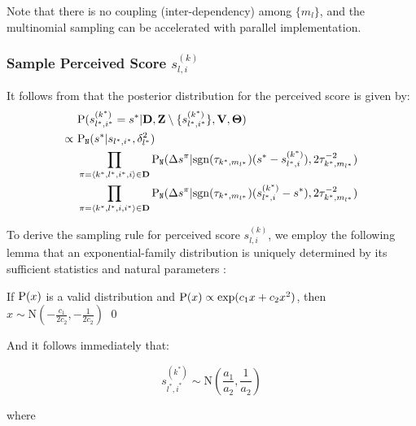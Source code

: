 Note that there is no coupling (inter-dependency) among $\{m_l\}$, and the
multinomial sampling can be accelerated with parallel implementation.

\subsubsection{Sample Perceived Score $s_{l,i}^{(k)}$}
It follows from  that the posterior distribution for the
perceived score is given by:
\begin{align}
& \P(s_{l^*,i^*}^{(k^*)} = s^* | \mathbf{D},
    \mathbf{Z}\setminus \{ s_{l^*,i^*}^{(k^*)} \}, \mathbf{V}, \mathbf{\Theta})
    \nonumber \\
\propto~ & \P_{\mathtt{N}}(s^* | s_{l^*,i^*}, \delta_{{l^*}}^2)
  \label{eq::tpp_s}\\
& \prod\limits_{\pi = \langle k^*,l^*,i^*,i\rangle \in \mathbf{D}}
    \P_{\mathtt{N}}(\Delta s^\pi |
      \mathrm{sgn}(\tau_{k^*,m_{l^*}}) ( s^* - s_{l^*,i}^{(k^*)}),
      2\tau_{k^*,m_{l^*}}^{-2}) \nonumber \\
& \prod\limits_{\pi = \langle k^*,l^*,i,i^*\rangle \in \mathbf{D}}
		\P_{\mathtt{N}}(\Delta s^\pi |
      \mathrm{sgn}(\tau_{k^*,m_{l^*}}) ( s_{l^*,i}^{(k^*)} - s^*),
      2\tau_{k^*,m_{l^*}}^{-2}) \nonumber
\end{align}

To derive the sampling rule for perceived score $s_{l,i}^{(k)}$, we employ the
following lemma that an exponential-family distribution is uniquely determined
by its sufficient statistics and natural parameters \cite{stuart1968advanced}:

\begin{lem}\label{lem::exp_dist}
If $\P(x)$ is a valid distribution and $\P(x) \propto \exp(c_1 x + c_2 x^2)$,
then $x \sim \mathrm{N}(- \frac{c_1}{2c_2}, -\frac{1}{2c_2})$
\qed
\end{lem}
And it follows immediately that:

\begin{equation}\label{eq::tpp_sps}
s_{l^*,i^*}^{(k^*)} \sim \mathrm{N}(\frac{a_1}{a_2}, \frac{1}{a_2})
\end{equation}

where

